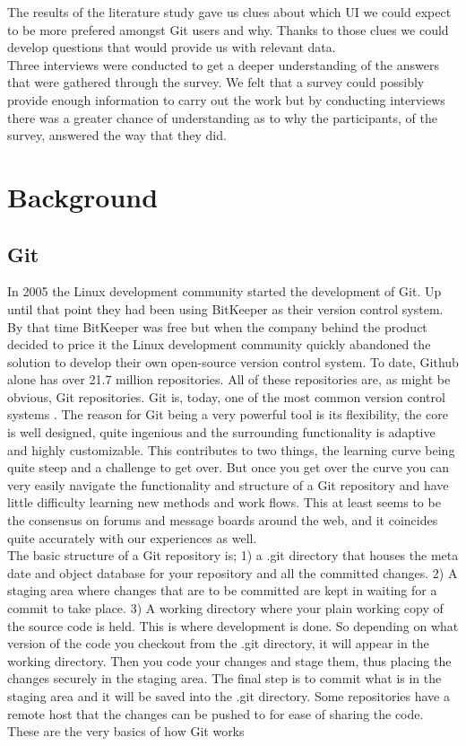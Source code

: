 \documentclass[a4paper,oneside]{bth} %
\begin{document}
		The results of the literature study gave us clues about which UI we could expect to be more prefered amongst Git users and why. Thanks to those clues we could develop questions that would provide us with relevant data.\\
		Three interviews were conducted to get a deeper understanding of the answers that were gathered through the survey.
		We felt that a survey could possibly provide enough information to carry out the work but by conducting interviews there was a greater chance of understanding as to why the participants, of the survey, answered the way that they did.
		
		\chapter{Background}
			\section{Git}
			In 2005 the Linux development community started the development of Git.
			Up until that point they had been using BitKeeper as their version control system. By that time BitKeeper was free but when the company behind the product decided to price it the Linux development community quickly abandoned the solution to develop their own open-source version control system.\cite{ProGit}
			To date, Github alone has over 21.7 million repositories.\cite{GithubAbout} All of these repositories are, as might be obvious, Git repositories. 
			Git is, today, one of the most common version control systems \cite{EclipseDeveoperReport}\cite{DeveloperProductivity}\cite{MicrosoftSurveyResults}. The reason for Git being a very powerful tool is its flexibility, the core is well designed, quite ingenious and the surrounding functionality is adaptive and highly customizable. This contributes to two things, the learning curve being quite steep and a challenge to get over. But once you get over the curve you can very easily navigate the functionality and structure of a Git repository and have little difficulty learning new methods and work flows. This at least seems to be the consensus on forums and message boards around the web, and it coincides quite accurately with our experiences as well.
			\\
			The basic structure of a Git repository is; 1) a .git directory that houses the meta date and object database for your repository and all the committed changes. 2) A staging area where changes that are to be committed are kept in waiting for a commit to take place. 3) A working directory where your plain working copy of the source code is held. This is where development is done. \cite{GitStructure} 
			So depending on what version of the code you checkout from the .git directory, it will appear in the working directory. Then you code your changes and stage them, thus placing the changes securely in the staging area. The final step is to commit what is in the staging area and it will be saved into the .git directory. Some repositories have a remote host that the changes can be pushed to for ease of sharing the code. These are the very basics of how Git works \cite{GitStructure}
			
\end{document}
